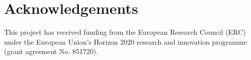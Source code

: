 \documentclass[acmsmall,screen,review]{acmart}
\begin{document}




\maketitle








%
\section{Acknowledgements}
	This project has received funding from the European Research Council (ERC) under the European Union's Horizon 2020 research and innovation programme (grant agreement No. 851720).




\end{document}
